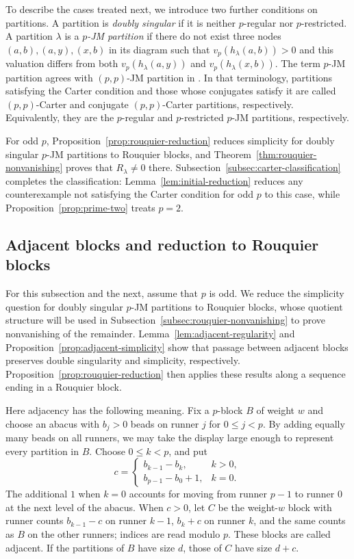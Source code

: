 \documentclass[12pt,reqno,a4paper]{amsart}
\numberwithin{equation}{section}
\numberwithin{figure}{section}
\theoremstyle{plain}
\theoremstyle{definition}
\begin{document}
To describe the cases treated next, we introduce two further
conditions on partitions.  A partition is \emph{doubly singular}
if it is neither $p$-regular nor $p$-restricted.  A partition $\lambda$
is a \emph{$p$-JM partition}
if there do not exist three nodes $(a,b),(a,y),(x,b)$ in its diagram
such that $v_p(h_\lambda(a,b))>0$ and this valuation differs from both
$v_p(h_\lambda(a,y))$ and $v_p(h_\lambda(x,b))$.
The term $p$-JM partition agrees with $(p,p)$-JM partition in
\cite[Conjecture~1.1 and the following discussion]{Fayers}.
In that terminology, partitions satisfying the Carter condition and
those whose conjugates satisfy it are called $(p,p)$-Carter and
conjugate $(p,p)$-Carter partitions, respectively.  Equivalently,
they are the $p$-regular and $p$-restricted $p$-JM partitions,
respectively.

For odd $p$, Proposition~\ref{prop:rouquier-reduction} reduces
simplicity for doubly singular $p$-JM partitions to Rouquier blocks,
and Theorem~\ref{thm:rouquier-nonvanishing} proves that $R_\lambda\neq0$
there.  Subsection~\ref{subsec:carter-classification} completes the
classification: Lemma~\ref{lem:initial-reduction} reduces any
counterexample not satisfying the Carter condition for odd $p$ to
this case, while
Proposition~\ref{prop:prime-two} treats $p=2$.

\subsection{Adjacent blocks and reduction to Rouquier blocks}
\label{subsec:rouquier-reduction}

For this subsection and the next, assume that $p$ is odd.
We reduce the simplicity question for doubly singular $p$-JM
partitions to Rouquier blocks, whose quotient structure will be used
in Subsection~\ref{subsec:rouquier-nonvanishing} to prove nonvanishing
of the remainder.  Lemma~\ref{lem:adjacent-regularity} and
Proposition~\ref{prop:adjacent-simplicity} show that passage between
adjacent blocks preserves double singularity and simplicity,
respectively.  Proposition~\ref{prop:rouquier-reduction} then applies
these results along a sequence ending in a Rouquier block.

Here adjacency has the following meaning.  Fix a $p$-block $B$ of
weight $w$ and choose an abacus with $b_j>0$ beads on runner $j$
for $0\leq j<p$.  By adding equally many beads on all runners,
we may take the display large enough to represent every partition in $B$.
Choose $0\leq k<p$, and put
\[
 c=\begin{cases}
 b_{k-1}-b_k,&k>0,\\
 b_{p-1}-b_0+1,&k=0.
 \end{cases}
\]
The additional $1$ when $k=0$ accounts for moving from runner $p-1$
to runner $0$ at the next level of the abacus.
When $c>0$, let $C$ be the weight-$w$ block with runner counts
$b_{k-1}-c$ on runner $k-1$, $b_k+c$ on runner $k$, and the same
counts as $B$ on the other runners; indices are read modulo $p$.
These blocks are called adjacent.  If the partitions of $B$ have
size $d$, those of $C$ have size $d+c$.
\end{document}
